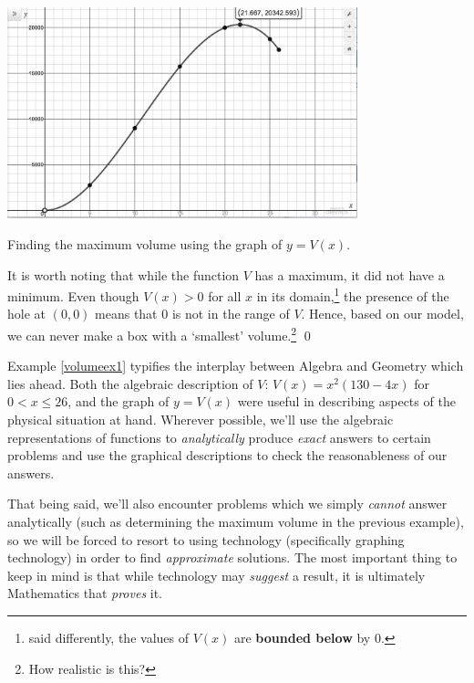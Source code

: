 \begin{ex}
\begin{enumerate}
\begin{center}

\includegraphics[width=4in]{./FunctionsandtheirRepresentationsGraphics/VolumeEx02.jpg} 

Finding the maximum volume using the graph of $y = V(x)$.

\end{center}


It is worth noting that while the function $V$ has a maximum, it did not have a minimum.  Even though $V(x)>0$ for all $x$ in its domain,\footnote{said differently, the values of $V(x)$ are \textbf{bounded below} by $0$.} the presence of the hole at $(0,0)$ means that $0$ is not in the range of $V$.  Hence, based on our model, we can never make a box with a  `smallest' volume.\footnote{How realistic is this?}  \qed

\end{enumerate}
\end{ex}

\medskip

Example \ref{volumeex1} typifies the interplay between Algebra and Geometry which lies ahead.  Both the algebraic description of  $V$: $V(x) = x^2 (130 - 4x)$ for $0 < x \leq 26$, and the graph of $y=V(x)$ were useful in describing aspects of the physical situation at hand.  Wherever possible, we'll use the algebraic representations of functions to \textit{analytically} produce \textit{exact} answers to certain problems and use the graphical descriptions to check the reasonableness of our answers. 

\medskip

That being said, we'll also encounter problems which we simply \textit{cannot} answer analytically (such as determining the maximum volume in the previous example), so we will be forced to resort to using technology (specifically graphing technology) in order to find \textit{approximate} solutions.  The most important thing to keep in mind is that while technology may \textit{suggest} a result, it is ultimately Mathematics that \textit{proves} it. 

